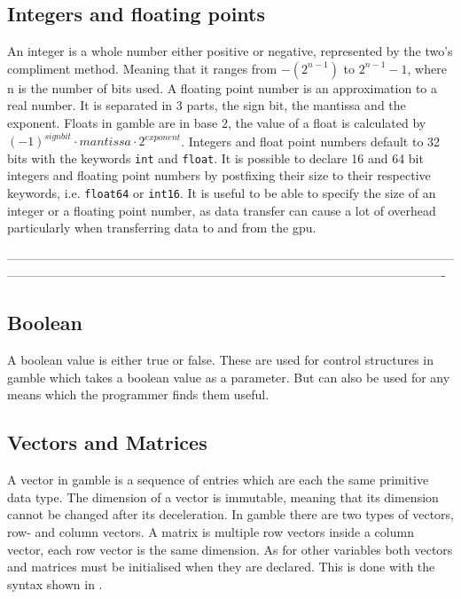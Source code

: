 \subsection*{Integers and floating points}
An integer is a whole number either positive or negative, represented by the two's compliment method. 
Meaning that it ranges from $-(2^{n-1}) $ to $2^{n-1} - 1 $, where n is the number of bits used.
A floating point number is an approximation to a real number. 
It is separated in 3 parts, the sign bit, the mantissa and the exponent. 
Floats in \gls{gamble} are in base 2, the value of a float is calculated by $ (-1)^{sign bit} \cdot mantissa \cdot 2^{exponent} $. 
Integers and float point numbers default to 32 bits with the keywords \texttt{int} and \texttt{float}. 
It is possible to declare 16 and 64 bit integers and floating point numbers by postfixing their size to their respective keywords, i.e. \texttt{float64} or \texttt{int16}. 
It is useful to be able to specify the size of an integer or a floating point number, as data transfer can cause a lot of overhead particularly when transferring data to and from the \acrshort{gpu}. 

----------------------------------------------------------------------------------------------------------------------------------------------------------------------------------------------------------------------

\subsection*{Boolean}
A boolean value is either true or false. 
These are used for control structures in \gls{gamble} which takes a boolean value as a parameter. 
But can also be used for any means which the programmer finds them useful. 

\subsection*{Vectors and Matrices}
A vector in \gls{gamble} is a sequence of entries which are each the same primitive data type. 
The dimension of a vector is immutable, meaning that its dimension cannot be changed after its deceleration. 
In \gls{gamble} there are two types of vectors, row- and column vectors. 
A matrix is multiple row vectors inside a column vector, each row vector is the same dimension. 
As for other variables both vectors and matrices must be initialised when they are declared. 
This is done with the syntax shown in .

